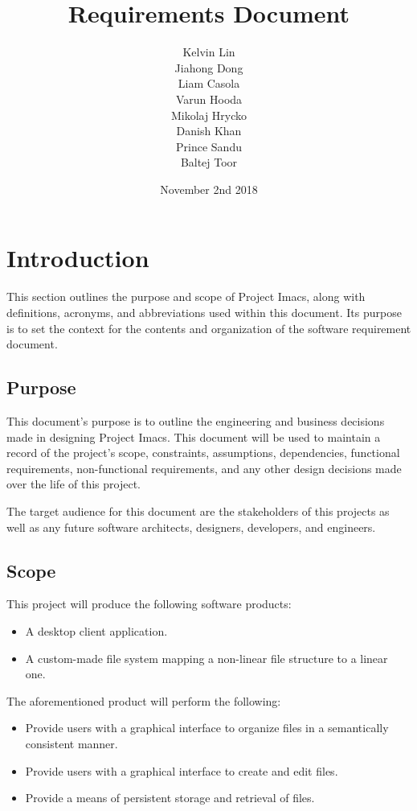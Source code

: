\documentclass{article}
\title{Requirements Document}
\author{Kelvin Lin\\ Jiahong Dong\\ Liam Casola\\ Varun Hooda\\ Mikolaj Hrycko\\ Danish Khan\\ Prince Sandu\\ Baltej Toor }
\date{November 2nd 2018}
\begin{document}
\maketitle

\section{Introduction}
This section outlines the purpose and scope of Project Imacs, along with definitions, acronyms, and abbreviations used within this document. Its purpose is to set the context for the contents and organization of the software requirement document.

\subsection{Purpose}
This document's purpose is to outline the engineering and business decisions made in designing Project Imacs. This document will be used to maintain a record of the project's scope, constraints, assumptions, dependencies, functional requirements, non-functional requirements, and any other design decisions made over the life of this project.

The target audience for this document are the stakeholders of this projects as well as any future software architects, designers, developers, and engineers.

\subsection{Scope}
This project will produce the following software products:

\begin{itemize}
    \item A desktop client application.
    \item A custom-made file system mapping a non-linear file structure to a linear one.
\end{itemize}

The aforementioned product will perform the following:

\begin{itemize}
    \item Provide users with a graphical interface to organize files in a semantically consistent manner.
    \item Provide users with a graphical interface to create and edit files.
    \item Provide a means of persistent storage and retrieval of files.
\end{itemize}
\end{document}
